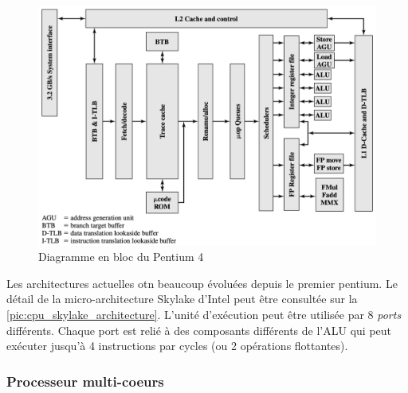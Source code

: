 \begin{figure}
    \center
    \includegraphics[width=13cm]{images/cpu_superscalar_pentium.png}
    \caption[Diagramme en bloc du Pentium 4]{Diagramme en bloc du Pentium 4 \cite{stallings2003organisation}
    \label{cpu_superscalar_pentium}}
\end{figure}



Les architectures actuelles otn beaucoup évoluées depuis le premier pentium. Le détail de la micro-architecture Skylake d'Intel peut être consultée sur la \autoref{pic:cpu_skylake_architecture}. L'unité d'exécution peut être utilisée par 8 \textit{ports} différents. Chaque port est relié à des composants différents de l'ALU qui peut exécuter jusqu'à 4 instructions par cycles (ou 2 opérations flottantes).






\subsubsection{Processeur multi-coeurs} \label{sec:multicore}


